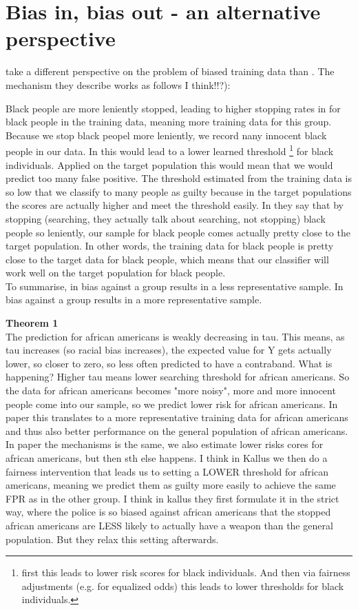 \section*{Bias in, bias out - an alternative perspective}

\cite{RambachanBBOEFW} take a different perspective on the problem of biased training data than \cite{kallus}.
The mechanism they describe works as follows I think!!?): 

Black people are more leniently stopped, leading to higher stopping rates in for black people in the training data, meaning
more training data for this group. Because we stop black peopel more leniently, we record nany innocent black people in our data.
In \cite{kallus} this would lead to a lower learned threshold \footnote{first this leads to lower risk scores for black individuals. And then via fairness adjustments (e.g. for equalized odds) this leads to lower thresholds for black individuals.}
for black individuals. Applied on the target population this would mean that we would predict too many false positive. The threshold estimated from the training 
data is so low that we classify to many people as guilty because in the target populations the scores are actually higher and meet the threshold easily.
In \cite{RambachanBBOEFW} they say that by stopping (searching, they actually talk about searching, not stopping) black people so leniently, our sample for black people comes actually pretty
close to the target population.
In other words, the training data for black people is pretty close to the target data for black people, which means that our classifier will work well on the
target population for black people. \\
To summarise, in \cite{kallus} bias against a group results in a less representative sample. In \cite{RambachanBBOEFW} bias against a group results in a more representative sample.


\textbf{Theorem 1}\\
The prediction for african americans is weakly decreasing in tau. This means, as tau increases (so racial bias increases), the expected value for Y gets actually lower,
so closer to zero, so less often predicted to have a contraband. What is happening? Higher tau means lower searching threshold for african americans.
So the data for african americans becomes "more noisy", more and more innocent people come into our sample, so we predict lower risk for african americans. 
In \cite{RambachanBBOEFW} paper this translates to a more representative training data for african americans and thus also better performance on the general population of african americans.
In \cite{kallus} paper the mechanisms is the same, we also estimate lower risks cores for african americans, but then sth else happens.
I think in Kallus we then do a fairness intervention that leads us to setting a LOWER threshold for african americans, meaning we predict them as
guilty more easily to achieve the same FPR as in the other group. I think in kallus they first formulate it in the strict way, where the police is so biased against african americans
that the stopped african americans are LESS likely to actually have a weapon than the general population. But they relax this setting afterwards.



